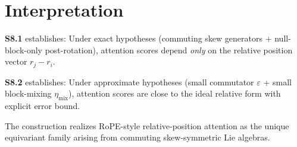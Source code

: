 \documentclass[11pt]{article}
\begin{document}
\section*{Interpretation}

\textbf{S8.1} establishes: Under exact hypotheses (commuting skew generators + null-block-only post-rotation), attention scores depend \emph{only} on the relative position vector $r_j - r_i$.

\textbf{S8.2} establishes: Under approximate hypotheses (small commutator $\varepsilon$ + small block-mixing $\eta_{\mathrm{mix}}$), attention scores are close to the ideal relative form with explicit error bound.

The construction realizes RoPE-style relative-position attention as the unique equivariant family arising from commuting skew-symmetric Lie algebras.
\end{document}
